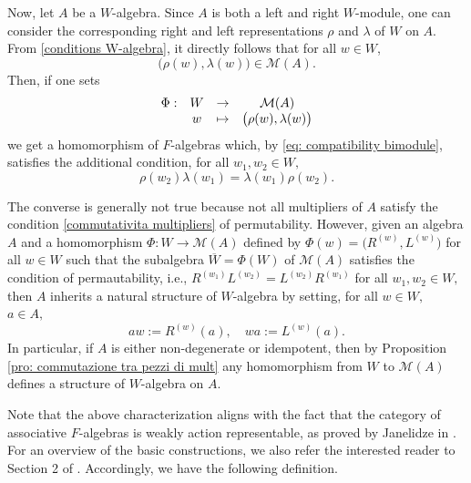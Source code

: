 \documentclass[reqno]{amsart}
\theoremstyle{definition}
\numberwithin{equation}{section}
\numberwithin{theorem}{section}
\newcommand{\M}{\mathcal{M}}
\begin{document}
Now, let $A$ be a $W$-algebra. Since $A$  is both a left and right $W$-module, one can consider the corresponding right and left representations $\rho$ and $\lambda$ of $W$ on $A$. From \eqref{conditions W-algebra}, it directly follows that for all $w\in W$,
$$
\big( \rho(w), \lambda(w)\big)\in\M(A).
$$
Then, if one sets
\begin{equation}\label{omomorphism from W to M(A)}
    \begin{matrix}
    \Phi: & W & \rightarrow & \M(A) \\
    \null & w & \mapsto & \big(\rho(w), \lambda(w)\big)
\end{matrix}
\end{equation}
we get a homomorphism of $F$-algebras which, by \eqref{eq: compatibility bimodule}, satisfies the additional condition, for all  $w_1,w_2\in W,$
\begin{equation}\label{Phi permutability}
    \rho(w_2)\lambda(w_1)=\lambda(w_1)\rho(w_2).
\end{equation}







The converse is generally not true because not all multipliers of $A$ satisfy the condition \eqref{commutativita multipliers} of permutability. However, given an algebra $A$ and a homomorphism $\Phi:W\to \M(A)$ defined by $\Phi(w)=\big(R^{(w)},L^{(w)}\big)$ for all $w\in W$ such that the subalgebra $\overline{W}=\Phi(W)$ of $\M(A)$ satisfies the condition of permautability, i.e.,  $ R^{(w_1)}L^{(w_2)}=L^{(w_2)}R^{(w_1)}$ for all $w_1,w_2\in W,$ then $A$ inherits a natural structure of $W$-algebra by setting, for all $w\in W,$ $a\in A,$
\begin{equation*}
  aw := 
  R^{(w)}(a),   \quad wa := 
  L^{(w)}(a).
\end{equation*}
In particular, if $A$ is either non-degenerate or idempotent, then by Proposition \ref{pro: commutazione tra pezzi di mult} any homomorphism from $W$ to $\M(A)$ defines a structure of $W$-algebra on $A$.


Note that the above characterization aligns with the fact that the category of associative $F$-algebras is weakly action representable, as proved by Janelidze in \cite{Janelidze2022}. For an overview of the basic constructions, we also refer the interested reader to Section 2 of \cite{CigoliManciniMetere2023}.
Accordingly, we have the following definition. 
\end{document}
